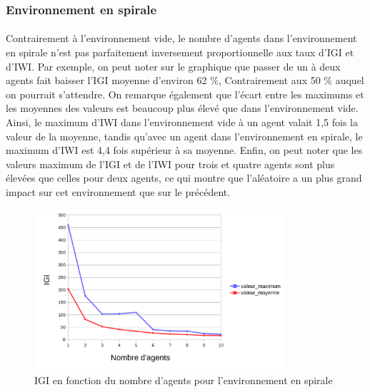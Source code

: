 \documentclass{article}
\begin{document}
        \subsubsection{Environnement en spirale}
        \paragraph{} Contrairement à l'environnement vide, le nombre d'agents dans l'environnement en spirale n'est pas parfaitement inversement proportionnelle aux taux d'IGI et d'IWI.
        Par exemple, on peut noter sur le graphique que passer de un à deux agents fait baisser l'IGI moyenne d'environ 62 \%, Contrairement aux 50 \% auquel on pourrait s'attendre.
        On remarque également que l'écart entre les maximums et les moyennes des valeurs est beaucoup plus élevé que dans l'environnement vide. Ainsi, le maximum d'IWI dans l'environnement vide à un agent valait 1,5 fois la valeur de la moyenne, tandis qu'avec un agent dans l'environnement en spirale, le maximum d'IWI est 4,4 fois supérieur à sa moyenne.
        Enfin, on peut noter que les valeurs maximum de l'IGI et de l'IWI pour trois et quatre agents sont plus élevées que celles pour deux agents, ce qui montre que l'aléatoire a un plus grand impact sur cet environnement que sur le précédent.
            \begin{figure}[!h]
                \begin{center}
                    \includegraphics[width = 0.82\textwidth]{graphes pdf/variance tortues IGI spirale.pdf}
                    \caption{IGI en fonction du nombre d'agents pour l'environnement en spirale}
                \end{center}
            \end{figure}
\end{document}
